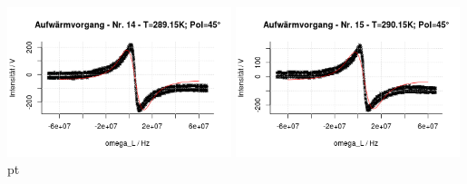 \documentclass[12pt]{article}
\begin{document}
\begin{minipage}[h!]{\textwidth}
{		\includegraphics[width=0.49\textwidth]{figures/warm45-14.png}\vskip -10pt}	\includegraphics[width=0.49\textwidth]{figures/warm45-15.png} pt
\end{minipage}\newpage
\end{document}
